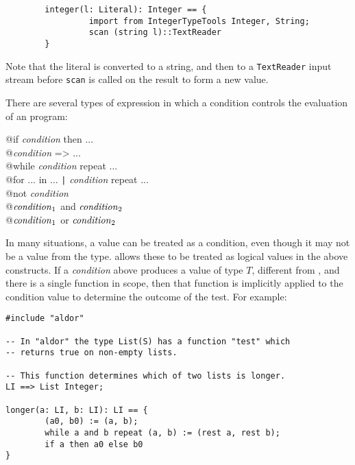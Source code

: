 \begin{small}
\begin{verbatim}
        integer(l: Literal): Integer == {
                 import from IntegerTypeTools Integer, String;
                 scan (string l)::TextReader
        }
\end{verbatim}
\end{small}

Note that the literal  is converted to a string, and then 
to a {\tt TextReader} input stream before {\tt scan} is called on
the result to form a new value.


There are several types of expression in which a condition controls
the evaluation of an \asharp{} program:  

\begin{small}
\begin{tt}
\verb@    @if {\it condition} then ... \\
\verb@    @{\it condition} => ... \\
\verb@    @while {\em condition} repeat ... \\
\verb@    @for ... in ... \verb+|+ {\it condition} repeat ... \\
\verb@    @not {\it condition} \\
\verb@    @${\it condition}_1$ and ${\it condition}_2$ \\
\verb@    @${\it condition}_1$ or ${\it condition}_2$
\end{tt}
\end{small}


In many situations, a value can be treated as a condition, even though
it may not be a value from the  type. \asharp{} allows
these to be treated as logical values in the above constructs. If a
{\em condition} above  produces a value of type $T$, different from
, and there is a single function  in scope, then that
 function is implicitly applied to the condition value to determine
the outcome of the test. For example:

\begin{small}%
\begin{verbatim}
#include "aldor"

-- In "aldor" the type List(S) has a function "test" which
-- returns true on non-empty lists.

-- This function determines which of two lists is longer.
LI ==> List Integer;

longer(a: LI, b: LI): LI == {
        (a0, b0) := (a, b);
        while a and b repeat (a, b) := (rest a, rest b);
        if a then a0 else b0
}
\end{verbatim}
\end{small}

